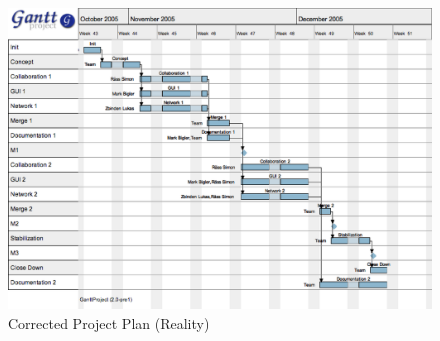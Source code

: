\begin{figure}[H]
 \centering
 \includegraphics[width=20cm,width=14.27cm,angle=90]{../images/finalreport/projectplan/ace.eps}
 \caption{Corrected Project Plan (Reality)}
\end{figure}

